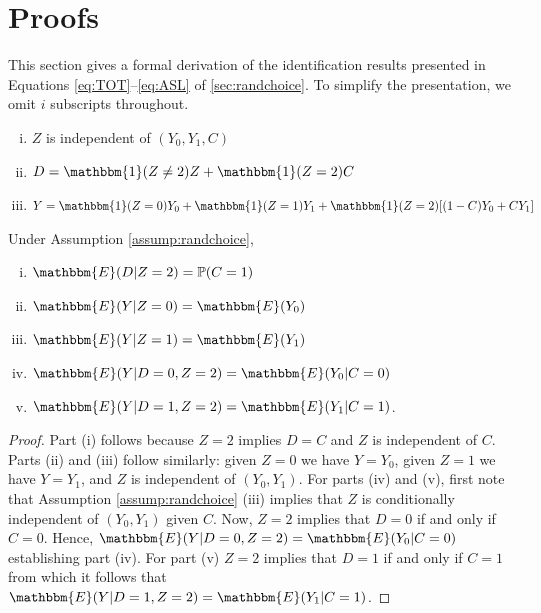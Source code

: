 \documentclass[12pt, a4paper]{article}
\begin{document}

\endgroup


\section{Proofs}
\label{sec:proofs}

This section gives a formal derivation of the identification results presented in Equations \eqref{eq:TOT}--\eqref{eq:ASL} of \autoref{sec:randchoice}.
To simplify the presentation, we omit $i$ subscripts throughout.

\begin{assumption}\mbox{}
\label{assump:randchoice}
   \begin{enumerate}[(i)]
   \item $Z$ is independent of $(Y_{0}, Y_{1}, C)$
   \item $D = \mathbbm{1}(Z \neq 2)Z + \mathbbm{1}(Z = 2)C$
   \item $Y = \mathbbm{1}(Z = 0) Y_{0} + \mathbbm{1}(Z = 1) Y_{1} + \mathbbm{1}(Z = 2) [ (1 - C) Y_{0} + C Y_{1}]$
   \end{enumerate}
\end{assumption}

\begin{lem}
Under Assumption \ref{assump:randchoice},
\label{lem_randchoice}
   \begin{enumerate}[(i)]
       \item $\mathbbm{E}(D|Z=2) = \mathbb{P}(C=1)$
       \item $\mathbbm{E}(Y|Z=0) = \mathbbm{E}(Y_0)$
       \item $\mathbbm{E}(Y|Z=1) = \mathbbm{E}(Y_1)$
       \item $\mathbbm{E}(Y|D=0,Z=2) = \mathbbm{E}(Y_0|C=0)$
       \item $\mathbbm{E}(Y|D=1,Z=2) = \mathbbm{E}(Y_1|C=1)$.
   \end{enumerate} 
\end{lem}

\begin{proof}
Part (i) follows because $Z=2$ implies $D=C$ and $Z$ is independent of $C$.  
Parts (ii) and (iii) follow similarly: given $Z=0$ we have $Y = Y_0$, given $Z=1$ we have $Y = Y_1$, and $Z$ is independent of $(Y_0,Y_1)$.
For parts (iv) and (v), first note that Assumption \ref{assump:randchoice} (iii) implies that $Z$ is conditionally independent of $(Y_0,Y_1)$ given $C$.
Now, $Z=2$ implies that $D=0$ if and only if $C=0$. Hence, $\mathbbm{E}(Y|D=0, Z=2) = \mathbbm{E}(Y_0|C=0)$ establishing part (iv).
For part (v) $Z=2$ implies that $D=1$ if and only if $C=1$ from which it follows that $\mathbbm{E}(Y|D=1, Z=2) = \mathbbm{E}(Y_1|C=1)$.
\end{proof}
\end{document}

